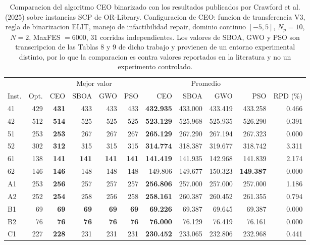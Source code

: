 \begin{table}[htbp]
\centering
\footnotesize
\caption{Comparacion del algoritmo CEO binarizado con los resultados publicados por Crawford et al. (2025) sobre instancias SCP de OR-Library. Configuracion de CEO: funcion de transferencia V3, regla de binarizacion ELIT, manejo de infactibilidad repair, dominio continuo $[-5,5]$, $N_p=10$, $N=2$, MaxFES $=6000$, 31 corridas independientes. Los valores de SBOA, GWO y PSO son transcripcion de las Tablas 8 y 9 de dicho trabajo y provienen de un entorno experimental distinto, por lo que la comparacion es contra valores reportados en la literatura y no un experimento controlado.}
\label{tab:ceo-scp}
\begin{tabular}{lrrrrrrrrrr}
\toprule
 & & \multicolumn{4}{c}{Mejor valor} & \multicolumn{4}{c}{Promedio} & \\
\cmidrule(lr){3-6} \cmidrule(lr){7-10}
Inst. & Opt. & CEO & SBOA & GWO & PSO & CEO & SBOA & GWO & PSO & RPD (\%) \\
\midrule
41 & 429 & \textbf{431} & 433 & 433 & 433 & \textbf{432.935} & 433.000 & 433.419 & 433.258 & 0.466 \\
42 & 512 & \textbf{514} & 525 & 525 & 525 & \textbf{523.129} & 525.968 & 525.935 & 526.290 & 0.391 \\
51 & 253 & \textbf{253} & 267 & 267 & 267 & \textbf{265.129} & 267.290 & 267.194 & 267.323 & 0.000 \\
52 & 302 & \textbf{312} & 315 & 315 & 315 & \textbf{314.774} & 318.387 & 319.677 & 318.742 & 3.311 \\
61 & 138 & \textbf{141} & \textbf{141} & \textbf{141} & \textbf{141} & \textbf{141.419} & 141.935 & 142.968 & 141.839 & 2.174 \\
62 & 146 & \textbf{146} & 148 & 148 & 148 & 149.806 & 149.677 & 150.323 & \textbf{149.387} & 0.000 \\
A1 & 253 & \textbf{256} & 257 & 257 & 257 & \textbf{256.806} & 257.000 & 257.000 & 257.000 & 1.186 \\
A2 & 252 & \textbf{254} & 258 & 256 & 258 & \textbf{258.161} & 260.387 & 260.452 & 261.355 & 0.794 \\
B1 & 69 & \textbf{69} & \textbf{69} & \textbf{69} & \textbf{69} & \textbf{69.226} & 69.387 & 69.645 & 69.387 & 0.000 \\
B2 & 76 & \textbf{76} & \textbf{76} & \textbf{76} & \textbf{76} & \textbf{76.000} & 76.129 & 76.419 & 76.161 & 0.000 \\
C1 & 227 & \textbf{228} & 231 & 231 & 231 & \textbf{230.452} & 233.065 & 232.806 & 232.968 & 0.441 \\

\end{tabular}
\end{table}
